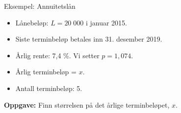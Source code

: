 \greenheader
\begin{frame}[t]{Eksempel: Annuitetslån}
\begin{center}
\end{center}
\medskip
\begin{itemize}
    \item Lånebeløp: $L=20\;000$ i januar 2015.\\
    \item Siste terminbeløp betales inn 31. desember 2019.
    \item Årlig rente: 7,4 \%. Vi setter $p=1,074$. 
    \item Årlig terminbeløp = $x$.
    \item Antall terminbeløp: 5.
\end{itemize}

\medskip
\textbf{Oppgave:} Finn størrelsen på det årlige terminbeløpet, $x$. 
\end{frame}

